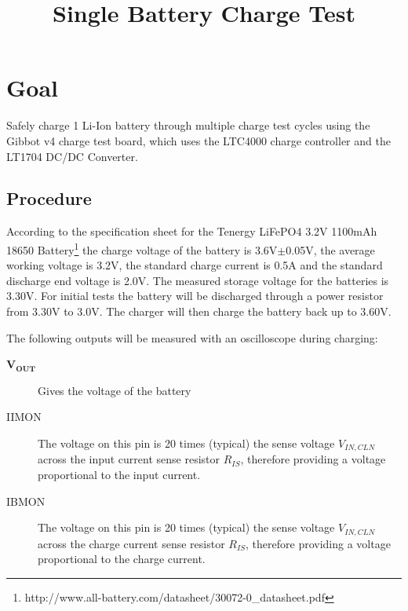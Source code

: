 \documentclass{article}
\begin{document}
\title{Single Battery Charge Test}
\date{}
\maketitle
\section{Goal}
Safely charge 1 Li-Ion battery through multiple charge test cycles using the Gibbot v4 charge test board, which uses the LTC4000 charge controller and the LT1704 DC/DC Converter. 

\subsection{Procedure}
According to the specification sheet for the Tenergy LiFePO4 3.2V 1100mAh 18650 Battery\footnote{http://www.all-battery.com/datasheet/30072-0\_datasheet.pdf} the charge voltage of the battery is 3.6V$\pm$0.05V, the average working voltage is 3.2V, the standard charge current is 0.5A and the standard discharge end voltage is 2.0V. The measured storage voltage for the batteries is 3.30V. 
For initial tests the battery will be discharged through a power resistor from 3.30V to 3.0V. The charger will then charge the battery back up to 3.60V.

The following outputs will be measured with an oscilloscope during charging:
\begin{description}
\item[$\mathbf{V_{OUT}}$] Gives the voltage of the battery
\item[IIMON] The voltage on this pin is 20 times (typical) the sense voltage $V_{IN,CLN}$across the input current sense resistor $R_{IS}$, therefore providing a voltage proportional to the input current.
\item[IBMON] The voltage on this pin is 20 times (typical) the sense voltage $V_{IN,CLN}$across the charge current sense resistor $R_{IS}$, therefore providing a voltage proportional to the charge current.
\end{description}
\end{document}
